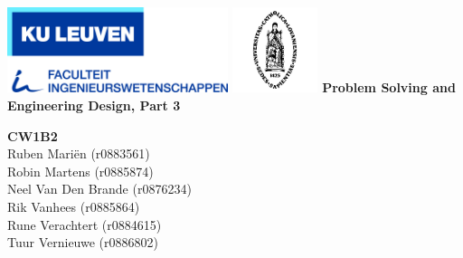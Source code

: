 \begin{titlepage}
    \newpage
    \thispagestyle{empty}
    \frenchspacing
    \hspace{-0.2cm}
    \hspace{0.2cm}
    \hspace{0.2cm}
    \includegraphics[height=2.5cm]{images/misc/logoFirW.jpg}
    \hspace{5.8cm}
    \includegraphics[height=2.5cm]{images/misc/kul_logo.jpg}
    \vfill
    \vspace{0.5cm}
    \centering\Large{\rm\textbf{{Problem Solving and Engineering Design, Part 3}}}
    \vspace*{0.5cm}\vfill
    \begin{center}
        \begin{minipage}[t]{\textwidth}
            \begin{center}
                \Large{\rm{\textbf{CW1B2}}}\\
                \vspace{0.3cm}
                \normalsize{\rm {Ruben Mariën (r0883561)}}\\
                {\rm {Robin Martens (r0885874)}}\\
                {\rm {Neel Van Den Brande (r0876234)}}\\
                {\rm {Rik Vanhees (r0885864)}}\\
                {\rm {Rune Verachtert (r0884615)}}\\
                {\rm {Tuur Vernieuwe (r0886802)}}\\
                \vspace{2.5cm}
                

\end{center}
\end{minipage}
\end{center}
\end{titlepage}
